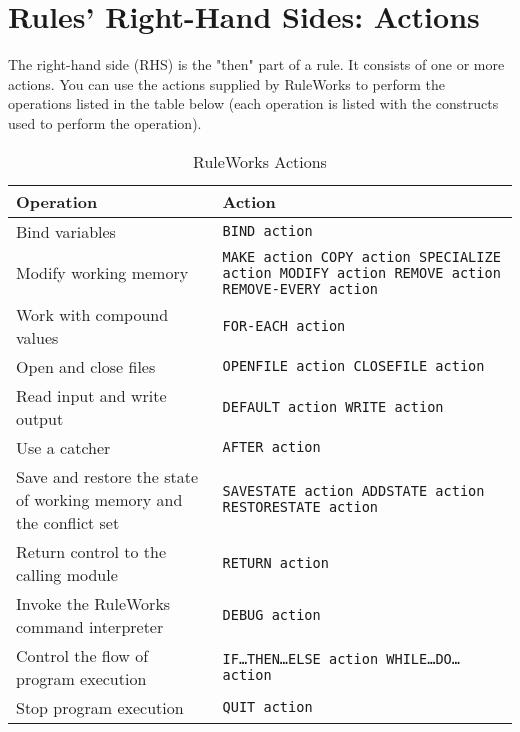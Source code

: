 \chapter{Rules' Right-Hand Sides: Actions}
\label{c:actions}

The right-hand side (RHS) is the "then" part of a rule. It consists of
one or more actions.  You can use the actions supplied by RuleWorks to
perform the operations listed in the table below (each operation is
listed with the constructs used to perform the operation).

\begin{table}[h]
  \begin{tabularx}{\columnwidth}{XX}
  \toprule
    Operation & Action \\
    \midrule
    Bind variables & \tt{BIND} action \\\addlinespace
    Modify working memory & \tt{MAKE} action\newline
                            \tt{COPY} action\newline
                            \tt{SPECIALIZE} action\newline
                            \tt{MODIFY} action\newline
                            \tt{REMOVE} action\newline
                            \tt{REMOVE-EVERY} action \\\addlinespace
    Work with compound values & \tt{FOR-EACH} action \\\addlinespace
    Open and close files & \tt{OPENFILE} action\newline
                           \tt{CLOSEFILE} action \\\addlinespace
    Read input and write output  
                           & \tt{DEFAULT} action \newline
                             \tt{WRITE} action \\\addlinespace
    Use a catcher & \tt{AFTER} action \\\addlinespace
    \raggedright
    Save and restore the state of working memory and the conflict set
                           & \tt{SAVESTATE} action\newline
                             \tt{ADDSTATE} action\newline
                             \tt{RESTORESTATE} action \\\addlinespace
    Return control to the  calling module
                           & \tt{RETURN} action \\\addlinespace
    \raggedright
    Invoke the RuleWorks command interpreter
                           & \tt{DEBUG} action \\\addlinespace
    Control the flow of  program execution
                           & \tt{IF}\ldots\tt{THEN}\ldots\tt{ELSE} action\newline
                             \tt{WHILE}\ldots\tt{DO}\ldots{} action \\\addlinespace
    Stop program execution & \tt{QUIT} action \\
    \bottomrule
  \end{tabularx}
  \caption{RuleWorks Actions}
\end{table}  

